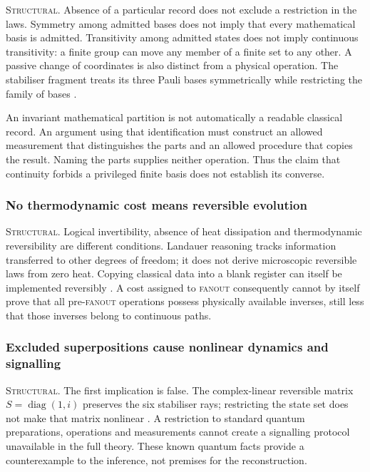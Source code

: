 \noindent\textsc{Structural.}
Absence of a particular record does not exclude a restriction in the laws.
Symmetry among admitted bases does not imply that every mathematical basis
is admitted. Transitivity among admitted states does not imply continuous
transitivity: a finite group can move any member of a finite set to any
other. A passive change of coordinates is also distinct from a physical
operation. The stabiliser fragment treats its three Pauli bases symmetrically
while restricting the family of bases \autocite{backens2014zx}.

An invariant mathematical partition is not automatically a readable
classical record. An argument using that identification must construct an
allowed measurement that distinguishes the parts and an allowed procedure
that copies the result. Naming the parts supplies neither operation. Thus
the claim that continuity forbids a privileged finite basis does not
establish its converse.

\subsubsection{No thermodynamic cost means reversible evolution}
\label{app:continuity-thermodynamics}

\noindent\textsc{Structural.}
Logical invertibility, absence of heat dissipation and thermodynamic
reversibility are different conditions. Landauer reasoning tracks
information transferred to other degrees of freedom; it does not derive
microscopic reversible laws from zero heat. Copying classical data into a
blank register can itself be implemented reversibly \autocite{bennett2003notes}.
A cost assigned to \textsc{fanout} consequently cannot by itself prove
that all pre-\textsc{fanout} operations possess physically available
inverses, still less that those inverses belong to continuous paths.

\subsubsection{Excluded superpositions cause nonlinear dynamics and signalling}
\label{app:continuity-signalling}

\noindent\textsc{Structural.}
The first implication is false. The complex-linear reversible matrix
$S=\operatorname{diag}(1,i)$ preserves the six stabiliser rays; restricting
the state set does not make that matrix nonlinear \autocite{backens2014zx}.
A restriction to standard quantum preparations, operations and measurements
cannot create a signalling protocol unavailable in the full theory. These
known quantum facts provide a counterexample to the inference, not premises
for the reconstruction.

